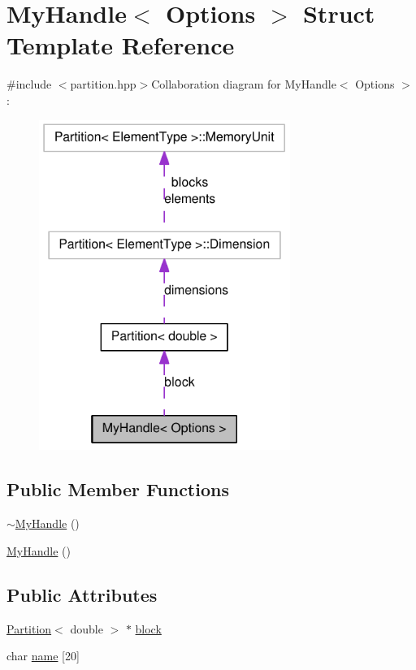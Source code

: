 \hypertarget{struct_my_handle}{
\section{MyHandle$<$ Options $>$ Struct Template Reference}
\label{struct_my_handle}
}


{\ttfamily \#include $<$partition.hpp$>$}Collaboration diagram for MyHandle$<$ Options $>$:\nopagebreak
\begin{figure}[H]
\begin{center}
\leavevmode
\includegraphics[width=232pt]{struct_my_handle__coll__graph}
\end{center}
\end{figure}
\subsection*{Public Member Functions}
\begin{DoxyCompactItemize}
\item 
\hyperlink{struct_my_handle_aef75f473c1362cfc6d0417362ae80ac0}{$\sim$MyHandle} ()
\item 
\hyperlink{struct_my_handle_aa7c00cfefdecc0c58c8b1d9f31880030}{MyHandle} ()
\end{DoxyCompactItemize}
\subsection*{Public Attributes}
\begin{DoxyCompactItemize}
\item 
\hyperlink{class_partition}{Partition}$<$ double $>$ $\ast$ \hyperlink{struct_my_handle_a26741ff1b1291395bdc4098ca83d568e}{block}
\item 
char \hyperlink{struct_my_handle_a37fc6e74a0be8f6d8a990c033ed7ee55}{name} \mbox{[}20\mbox{]}
\end{DoxyCompactItemize}


